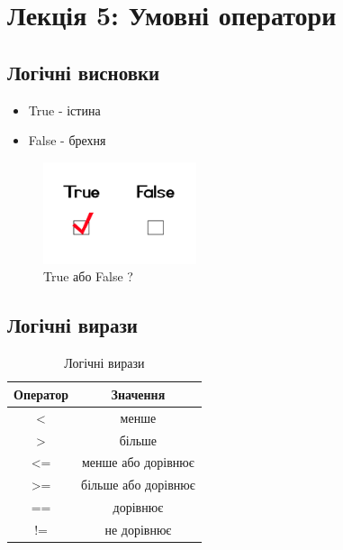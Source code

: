 \section{Лекція 5: Умовні оператори}
 
 \subsection{Логічні висновки} 
\begin{frame}
\begin{itemize}
  \item True - істина
  \item False - брехня
 \end{itemize}

\begin{figure}
\begin{center}
 \includegraphics[width=0.4\textwidth]{pictures/TrueFalse.png}
\caption{True або False ?}
\label{TrueFalse} 
\end{center}
\end{figure}
\end{frame}

 \subsection{Логічні вирази} 
\begin{frame}

\begin{table}
  \caption{Логічні вирази}
  \label{tab:}

  \begin{center}
    \begin{tabular}{|c|c|}
    \hline
      \textbf{Оператор} & \textbf{Значення} \\
    \hline  
      < & менше \\
    \hline
      >  & більше\\
    \hline
      <=  & менше або дорівнює \\
    \hline
      >=  & більше або дорівнює\\
    \hline
      ==  & дорівнює \\
    \hline
      !=  & не дорівнює \\
    \hline
    \end{tabular}
  \end{center}
\end{table}

\end{frame}

